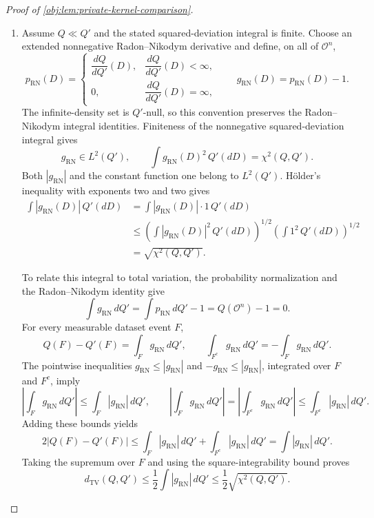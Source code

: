 \begin{proof}[Proof of \cref{obj:lem:private-kernel-comparison}]
\begin{enumerate}
\item Assume \(Q\ll Q'\) and the stated squared-deviation integral is finite. Choose an extended nonnegative Radon--Nikodym derivative and define, on all of \(\mathcal O^n\),
\[
p_{\mathrm{RN}}(D)=
\begin{cases}
\dfrac{dQ}{dQ'}(D),&\dfrac{dQ}{dQ'}(D)<\infty,\\
0,&\dfrac{dQ}{dQ'}(D)=\infty,
\end{cases}
\qquad
g_{\mathrm{RN}}(D)=p_{\mathrm{RN}}(D)-1.
\]
The infinite-density set is \(Q'\)-null, so this convention preserves the Radon--Nikodym integral identities. Finiteness of the nonnegative squared-deviation integral gives
\[
g_{\mathrm{RN}}\in L^2(Q'),
\qquad
\int g_{\mathrm{RN}}(D)^2\,Q'(dD)=\chi^2(Q,Q').
\]
Both \(|g_{\mathrm{RN}}|\) and the constant function one belong to \(L^2(Q')\). Hölder's inequality with exponents two and two gives
\[
\begin{aligned}
\int|g_{\mathrm{RN}}(D)|\,Q'(dD)
&=\int|g_{\mathrm{RN}}(D)|\cdot1\,Q'(dD)\\
&\le
\left(\int|g_{\mathrm{RN}}(D)|^2\,Q'(dD)\right)^{1/2}
\left(\int1^2\,Q'(dD)\right)^{1/2}\\
&=\sqrt{\chi^2(Q,Q')}.
\end{aligned}
\]

To relate this integral to total variation, the probability normalization and the Radon--Nikodym identity give
\[
\int g_{\mathrm{RN}}\,dQ'
=
\int p_{\mathrm{RN}}\,dQ'-1
=Q(\mathcal O^n)-1=0.
\]
For every measurable dataset event \(F\),
\[
Q(F)-Q'(F)=\int_F g_{\mathrm{RN}}\,dQ',
\qquad
\int_{F^c}g_{\mathrm{RN}}\,dQ'
=-\int_F g_{\mathrm{RN}}\,dQ'.
\]
The pointwise inequalities
\(g_{\mathrm{RN}}\le|g_{\mathrm{RN}}|\) and
\(-g_{\mathrm{RN}}\le|g_{\mathrm{RN}}|\), integrated over \(F\) and \(F^c\), imply
\[
\left|\int_F g_{\mathrm{RN}}\,dQ'\right|
\le\int_F|g_{\mathrm{RN}}|\,dQ',
\qquad
\left|\int_F g_{\mathrm{RN}}\,dQ'\right|
=
\left|\int_{F^c}g_{\mathrm{RN}}\,dQ'\right|
\le\int_{F^c}|g_{\mathrm{RN}}|\,dQ'.
\]
Adding these bounds yields
\[
2|Q(F)-Q'(F)|
\le
\int_F|g_{\mathrm{RN}}|\,dQ'
+\int_{F^c}|g_{\mathrm{RN}}|\,dQ'
=
\int|g_{\mathrm{RN}}|\,dQ'.
\]
Taking the supremum over \(F\) and using the square-integrability bound proves
\[
d_{\mathrm{TV}}(Q,Q')
\le\frac12\int|g_{\mathrm{RN}}|\,dQ'
\le\frac12\sqrt{\chi^2(Q,Q')}.
\]
\end{enumerate}
\end{proof}
